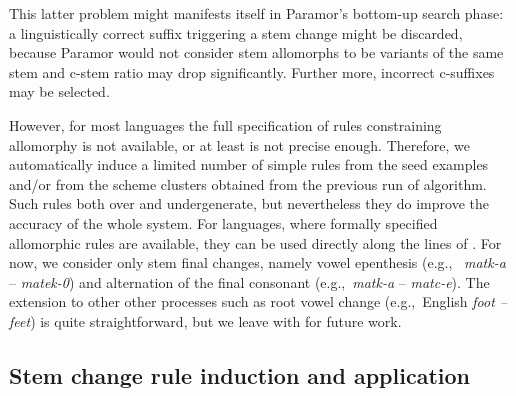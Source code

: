 \documentclass[11pt]{article}
\newcommand{\e}[1]{\textit{#1}} %
\newcommand{\eg}{e.g.,~}
\newcommand{\todoja}[1]{[\textbf{TODOJ} #1]}
\begin{document}
This latter problem might manifests itself in Paramor's bottom-up search phase: a linguistically correct suffix triggering a stem change might be discarded, because Paramor would not consider stem allomorphs to be variants of the same stem and c-stem ratio may drop significantly. Further more, incorrect c-suffixes may be selected.



However, for most languages the full specification of rules constraining allomorphy is not available, or at least is not precise enough. Therefore, we automatically induce a limited number of simple rules from the seed examples and/or from the scheme clusters obtained from the previous run of algorithm. Such rules both over and undergenerate, but nevertheless they do improve the accuracy of the whole system. For languages, where formally specified allomorphic rules are available, they can be used directly along the lines of
\cite{tepper10,tepper-xia-2008}.
%
For now, we consider only stem final changes, namely vowel epenthesis (\eg
\e{matk-a} -- \e{matek-0}) and alternation of the final consonant (\eg \e{matk-a} -- \e{matc-e}). The extension to other other processes such as root vowel change (\eg English \e{foot -- feet}) is quite straightforward, but we leave with for future work.



\subsection{Stem change rule induction and application}
\end{document}

